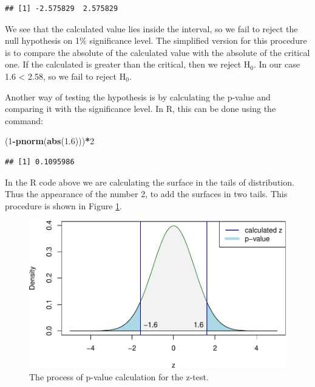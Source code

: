 \documentclass[
]{book}
\newenvironment{Shaded}{\begin{snugshade}}{\end{snugshade}}
\newcommand{\DecValTok}[1]{\textcolor[rgb]{0.00,0.00,0.81}{#1}}
\newcommand{\FloatTok}[1]{\textcolor[rgb]{0.00,0.00,0.81}{#1}}
\newcommand{\KeywordTok}[1]{\textcolor[rgb]{0.13,0.29,0.53}{\textbf{#1}}}
\newcommand{\NormalTok}[1]{#1}
\newcommand{\OperatorTok}[1]{\textcolor[rgb]{0.81,0.36,0.00}{\textbf{#1}}}
\theoremstyle{definition}
\theoremstyle{definition}
\theoremstyle{definition}
\theoremstyle{definition}
\theoremstyle{remark}
\begin{document}
\begin{verbatim}
## [1] -2.575829  2.575829
\end{verbatim}

We see that the calculated value lies inside the interval, so we fail to reject the null hypothesis on 1\% significance level. The simplified version for this procedure is to compare the absolute of the calculated value with the absolute of the critical one. If the calculated is greater than the critical, then we reject H\(_0\). In our case 1.6 \textless{} 2.58, so we fail to reject H\(_0\).

Another way of testing the hypothesis is by calculating the p-value and comparing it with the significance level. In R, this can be done using the command:

\begin{Shaded}
\begin{Highlighting}[]
\NormalTok{(}\DecValTok{1}\OperatorTok{{-}}\KeywordTok{pnorm}\NormalTok{(}\KeywordTok{abs}\NormalTok{(}\FloatTok{1.6}\NormalTok{)))}\OperatorTok{*}\DecValTok{2}
\end{Highlighting}
\end{Shaded}

\begin{verbatim}
## [1] 0.1095986
\end{verbatim}

In the R code above we are calculating the surface in the tails of distribution. Thus the appearance of the number 2, to add the surfaces in two tails. This procedure is shown in Figure \ref{fig:hypothesisTestingZTestPvalue}.

\begin{figure}
\centering
\includegraphics{Svetunkov---Statistics-for-Business-Analytics_files/figure-latex/hypothesisTestingZTestPvalue-1.pdf}
\caption{\label{fig:hypothesisTestingZTestPvalue}The process of p-value calculation for the z-test.}
\end{figure}
\end{document}
